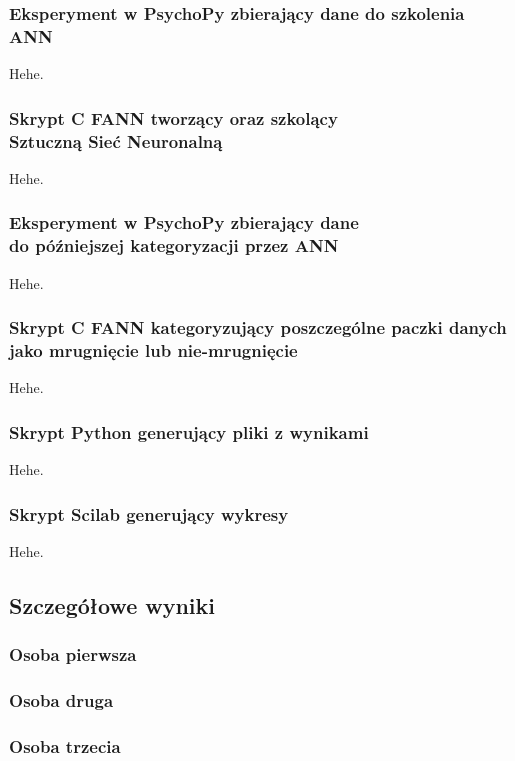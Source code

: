 \documentclass{article}
\begin{document}
        \subsubsection{Eksperyment w PsychoPy zbierający dane do szkolenia ANN}
            Hehe.
        \subsubsection{Skrypt C FANN tworzący oraz szkolący \\Sztuczną Sieć Neuronalną}
            Hehe.
        \subsubsection{Eksperyment w PsychoPy zbierający dane \\do późniejszej kategoryzacji przez ANN}
            Hehe.
        \subsubsection{Skrypt C FANN kategoryzujący poszczególne paczki danych \\jako mrugnięcie lub nie-mrugnięcie}
            Hehe.
        \subsubsection{Skrypt Python generujący pliki z wynikami}
            Hehe.
        \subsubsection{Skrypt Scilab generujący wykresy}
            Hehe.
    \subsection{Szczegółowe wyniki}
        \subsubsection{Osoba pierwsza}
        \subsubsection{Osoba druga}
        \subsubsection{Osoba trzecia}

% 
\end{document}
